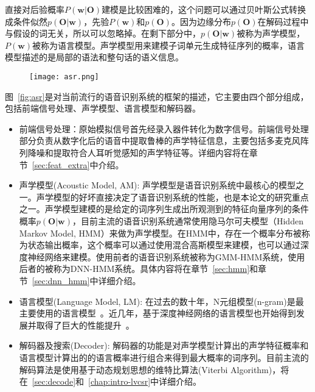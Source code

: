 直接对后验概率$P(\mathbf{w}|\mathbf{O})$建模是比较困难的，这个问题可以通过贝叶斯公式转换成条件似然$p(\mathbf{O}|\mathbf{w})$，先验$P(\mathbf{w})$和$p(\mathbf{O})$。因为边缘分布$p(\mathbf{O})$在解码过程中与假设的词无关，所以可以忽略掉。在剩下部分中，$p(\mathbf{O}|\mathbf{w})$被称为声学模型，$P(\mathbf{w})$被称为语言模型。声学模型用来建模子词单元生成特征序列的概率，语言模型描述的是局部的语法和整句话的语义信息。

\begin{figure}[!htp]
  \centering
    \captionstyle{\centering}
    \texttt{[image: asr.png]}
\end{figure}

图~\ref{fig:asr}是对当前流行的语音识别系统的框架的描述，它主要由四个部分组成，包括前端信号处理、声学模型、语言模型和解码器。
\begin{itemize}
    \item 前端信号处理：原始模拟信号首先经录入器件转化为数字信号。前端信号处理部分负责从数字化后的语音中提取鲁棒的声学特征信息，主要包括多麦克风阵列降噪和提取符合人耳听觉感知的声学特征等。详细内容将在章节~\ref{sec:feat_extra}中介绍。
    \item 声学模型(Acoustic Model, AM): 声学模型是语音识别系统中最核心的模型之一。声学模型的好坏直接决定了语音识别系统的性能，也是本论文的研究重点之一。声学模型建模的是给定的词序列生成出所观测到的特征向量序列的条件概率$p(\mathbf{O}|\mathbf{w})$，目前主流的语音识别系统通常使用隐马尔可夫模型（Hidden Markov Model, HMM）来做为声学模型。在HMM中，存在一个概率分布被称为状态输出概率，这个概率可以通过使用混合高斯模型来建模，也可以通过深度神经网络来建模。使用前者的语音识别系统被称为GMM-HMM系统，使用后者的被称为DNN-HMM系统。具体内容将在章节~\ref{sec:hmm}和章节~\ref{sec:dnn_hmm}中详细介绍。
    \item 语言模型(Language Model, LM): 在过去的数十年，N元组模型(n-gram)是最主要使用的语言模型~\cite{good1953population,katz1987estimation,brown1992class}。近几年，基于深度神经网络的语言模型也开始得到发展并取得了巨大的性能提升~\cite{mikolov2010recurrent,mikolov2012statistical}。
    \item 解码器及搜索(Decoder): 解码器的功能是对声学模型计算出的声学特征概率和语言模型计算出的的语言概率进行组合来得到最大概率的词序列。目前主流的解码算法是使用基于动态规划思想的维特比算法(Viterbi Algorithm)，将在~\ref{sec:decode}和~\ref{chap:intro-lvcsr}中详细介绍。
\end{itemize}

